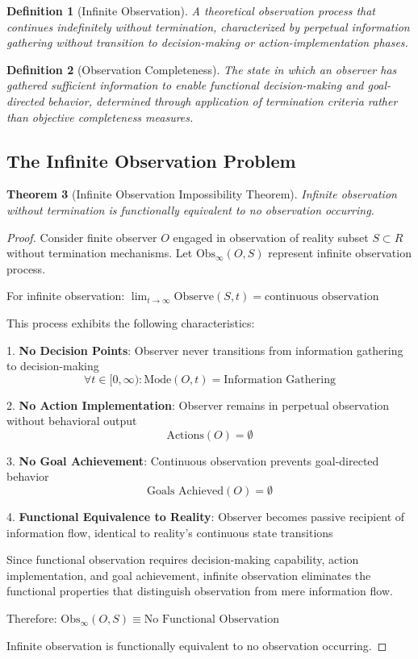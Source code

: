 \documentclass[12pt,a4paper]{article}
\newtheorem{theorem}{Theorem}[section]
\newtheorem{definition}[theorem]{Definition}
\begin{document}
\begin{definition}[Infinite Observation]
A theoretical observation process that continues indefinitely without termination, characterized by perpetual information gathering without transition to decision-making or action-implementation phases.
\end{definition}

\begin{definition}[Observation Completeness]
The state in which an observer has gathered sufficient information to enable functional decision-making and goal-directed behavior, determined through application of termination criteria rather than objective completeness measures.
\end{definition}

\subsection{The Infinite Observation Problem}

\begin{theorem}[Infinite Observation Impossibility Theorem]
Infinite observation without termination is functionally equivalent to no observation occurring.
\end{theorem}

\begin{proof}
Consider finite observer $O$ engaged in observation of reality subset $S \subset R$ without termination mechanisms. Let $\text{Obs}_{\infty}(O, S)$ represent infinite observation process.

For infinite observation: $\lim_{t \to \infty} \text{Observe}(S, t) = \text{continuous observation}$

This process exhibits the following characteristics:

1. \textbf{No Decision Points}: Observer never transitions from information gathering to decision-making
   $$\forall t \in [0, \infty): \text{Mode}(O, t) = \text{Information Gathering}$$

2. \textbf{No Action Implementation}: Observer remains in perpetual observation without behavioral output
   $$\text{Actions}(O) = \emptyset$$

3. \textbf{No Goal Achievement}: Continuous observation prevents goal-directed behavior
   $$\text{Goals Achieved}(O) = \emptyset$$

4. \textbf{Functional Equivalence to Reality}: Observer becomes passive recipient of information flow, identical to reality's continuous state transitions

Since functional observation requires decision-making capability, action implementation, and goal achievement, infinite observation eliminates the functional properties that distinguish observation from mere information flow.

Therefore: $\text{Obs}_{\infty}(O, S) \equiv \text{No Functional Observation}$

Infinite observation is functionally equivalent to no observation occurring.
\end{proof}
\end{document}

